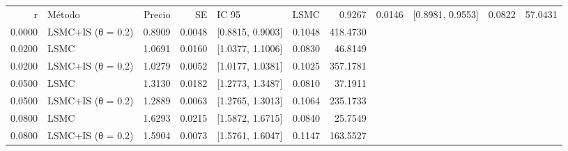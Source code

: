 \begin{tabular}{rlrrlrr}
\toprule
r & Método & Precio & SE & IC 95 %
 & LSMC & 0.9267 & 0.0146 & [0.8981, 0.9553] & 0.0822 & 57.0431 \\
0.0000 & LSMC+IS (θ = 0.2) & 0.8909 & 0.0048 & [0.8815, 0.9003] & 0.1048 & 418.4730 \\
0.0200 & LSMC & 1.0691 & 0.0160 & [1.0377, 1.1006] & 0.0830 & 46.8149 \\
0.0200 & LSMC+IS (θ = 0.2) & 1.0279 & 0.0052 & [1.0177, 1.0381] & 0.1025 & 357.1781 \\
0.0500 & LSMC & 1.3130 & 0.0182 & [1.2773, 1.3487] & 0.0810 & 37.1911 \\
0.0500 & LSMC+IS (θ = 0.2) & 1.2889 & 0.0063 & [1.2765, 1.3013] & 0.1064 & 235.1733 \\
0.0800 & LSMC & 1.6293 & 0.0215 & [1.5872, 1.6715] & 0.0840 & 25.7549 \\
0.0800 & LSMC+IS (θ = 0.2) & 1.5904 & 0.0073 & [1.5761, 1.6047] & 0.1147 & 163.5527 \\
\bottomrule
\end{tabular}
